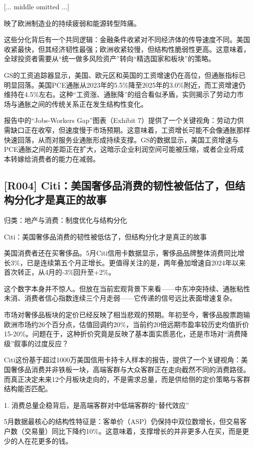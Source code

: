 \documentclass[11pt]{ctexart}
\begin{document}
[... middle omitted ...]

映了欧洲制造业的持续疲弱和能源转型阵痛。

这些分化背后有一个共同逻辑：金融条件收紧对不同经济体的传导速度不同。美国收紧最快，但其经济韧性最强；欧洲收紧较慢，但结构性脆弱性更高。这意味着，全球投资者需要从“统一做多风险资产”转向“精选国家和板块”的策略。

GS的工资追踪器显示，美国、欧元区和英国的工资增速仍在高位，但通胀指标已明显回落。美国PCE通胀从2023年的5.5\%降至2025年的3.0\%附近，而工资增速仍维持在4.5\%左右。这种“工资涨、通胀降”的组合看似矛盾，实则揭示了劳动力市场与通胀之间的传统关系正在发生结构性变化。

报告中的“Jobs-Workers Gap”图表（Exhibit 7）提供了一个关键视角：劳动力供需缺口正在收窄，但速度慢于市场预期。这意味着，工资增长可能不会像通胀那样快速回落，从而对服务业通胀形成持续支撑。GS的数据显示，美国工资增速与PCE通胀之间的差距正在扩大，这暗示企业利润空间可能被压缩，或者企业将成本转嫁给消费者的能力在减弱。

\subsection{[R004] Citi：美国奢侈品消费的韧性被低估了，但结构分化才是真正的故事}
{\small\color{refgray}归类：地产与消费：制度优化与结构分化}

Citi：美国奢侈品消费的韧性被低估了，但结构分化才是真正的故事

美国消费者还在买奢侈品。5月Citi信用卡数据显示，奢侈品品牌整体消费同比增长3\%，已是连续第五个月正增长。更值得关注的是，两年叠加增速自2024年以来首次转正，从4月的-3\%回升至+2\%。

这个数字本身并不惊人。但放在当前宏观背景下来看——中东冲突持续、通胀粘性未消、消费者信心指数连续三个月走弱——它传递的信号远比表面增速复杂。

市场对奢侈品板块的定价已经反映了相当悲观的预期。年初至今，奢侈品股票跑输欧洲市场约26个百分点，估值回调约20\%，当前约20倍远期市盈率较历史均值折价15-20\%。问题在于，这种折价究竟是反映了基本面实质恶化，还是市场对“消费降级”叙事的过度反应？

Citi这份基于超过1000万美国信用卡持卡人样本的报告，提供了一个关键视角：美国奢侈品消费并非铁板一块，高端客群与大众客群正在走向截然不同的消费路径。而真正决定未来12个月板块走向的，不是需求总量，而是供给侧的定价策略与客群结构能否匹配。

1. 消费总量企稳背后，是高端客群对中低端客群的“替代效应”

5月数据最核心的结构性特征是：客单价（ASP）仍保持中双位数增长，但交易客户数（交易量）同比下降约10\%。这意味着，支撑增长的并非更多人在买，而是更少的人在花更多的钱。
\end{document}
